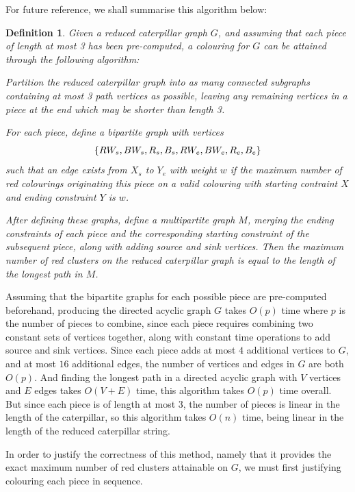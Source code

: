 \documentclass{mpaper}
\newtheorem{definition}[theorem]{Definition}
\begin{document}
For future reference, we shall summarise this algorithm below:

\begin{definition}
\label{def/caterpillar-algorithm}
  Given a reduced caterpillar graph $G$, and assuming that each piece of length at most 3 has been pre-computed, a colouring for $G$ can be attained through the following algorithm:

  Partition the reduced caterpillar graph into as many connected subgraphs containing at most 3 path vertices as possible, leaving any remaining vertices in a piece at the end which may be shorter than length 3.

  For each piece, define a bipartite graph with vertices $$\{RW_{s}, BW_{s}, R_{s}, B_{s}, \\ RW_{e}, BW_{e}, R_{e}, B_{e}\}$$ such that an edge exists from $X_{s}$ to $Y_{e}$ with weight $w$ if the maximum number of red colourings originating this piece on a valid colouring with starting contraint $X$ and ending constraint $Y$ is $w$.

  After defining these graphs, define a multipartite graph $M$, merging the ending constraints of each piece and the corresponding starting constraint of the subsequent piece, along with adding source and sink vertices. Then the maximum number of red clusters on the reduced caterpillar graph is equal to the length of the longest path in $M$.
\end{definition}


Assuming that the bipartite graphs for each possible piece are pre-computed beforehand, producing the directed acyclic graph $G$ takes $O(p)$ time where $p$ is the number of pieces to combine, since each piece requires combining two constant sets of vertices together, along with constant time operations to add source and sink vertices. Since each piece adds at most $4$ additional vertices to $G$, and at most $16$ additional edges, the number of vertices and edges in $G$ are both $O(p)$. And finding the longest path in a directed acyclic graph with $V$ vertices and $E$ edges takes $O(V+E)$ time, this algorithm takes $O(p)$ time overall. But since each piece is of length at most 3, the number of pieces is linear in the length of the caterpillar, so this algorithm takes $O(n)$ time, being linear in the length of the reduced caterpillar string.


In order to justify the correctness of this method, namely that it provides the exact maximum number of red clusters attainable on $G$, we must first justifying colouring each piece in sequence.
\end{document}

